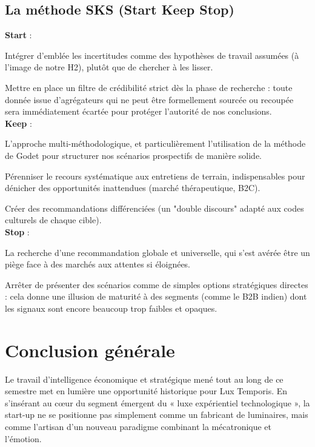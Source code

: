 \documentclass[11pt,a4paper]{article}
\begin{document}
\subsection{La méthode SKS (Start Keep Stop)\\ }

\textbf{Start} : 

Intégrer d'emblée les incertitudes comme des hypothèses de travail assumées (à l'image de notre H2), plutôt que de chercher à les lisser. 

Mettre en place un filtre de crédibilité strict dès la phase de recherche : toute donnée issue d'agrégateurs qui ne peut être formellement sourcée ou recoupée sera immédiatement écartée pour protéger l'autorité de nos conclusions.\\ 

\textbf{Keep} : 

L'approche multi-méthodologique, et particulièrement l'utilisation de la méthode de Godet pour structurer nos scénarios prospectifs de manière solide.

Pérenniser le recours systématique aux entretiens de terrain, indispensables pour dénicher des opportunités inattendues (marché thérapeutique, B2C). 

Créer des recommandations différenciées (un "double discours" adapté aux codes culturels de chaque cible).\\ 

\textbf{Stop} : 

La recherche d'une recommandation globale et universelle, qui s'est avérée être un piège face à des marchés aux attentes si éloignées.
 
Arrêter de présenter des scénarios comme de simples options stratégiques directes : cela donne une illusion de maturité à des segments (comme le B2B indien) dont les signaux sont encore beaucoup trop faibles et opaques.

\newpage

\section{Conclusion générale} 

Le travail d'intelligence économique et stratégique mené tout au long de ce semestre met en lumière une opportunité historique pour Lux Temporis. En s’insérant au cœur du segment émergent du « luxe expérientiel technologique », la start-up ne se positionne pas simplement comme un fabricant de luminaires, mais comme l'artisan d'un nouveau paradigme combinant la mécatronique et l'émotion.
\end{document}
